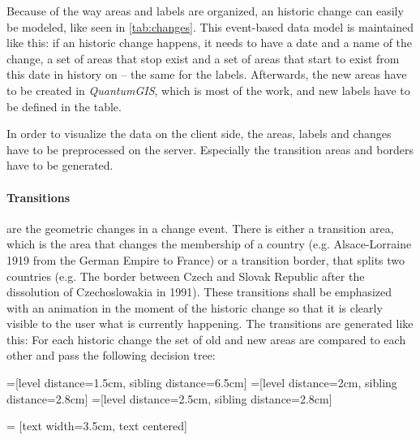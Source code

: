 Because of the way areas and labels are organized, an historic change can easily be modeled, like seen in \ref{tab:changes}. This event-based data model is maintained like this: if an historic change happens, it needs to have a date and a name of the change, a set of areas that stop exist and a set of areas that start to exist from this date in history on -- the same for the labels. Afterwards, the new areas have to be created in \textit{QuantumGIS}, which is most of the work, and new labels have to be defined in the table.

In order to visualize the data on the client side, the areas, labels and changes have to be preprocessed on the server. Especially the transition areas and borders have to be generated.

\paragraph{Transitions} are the geometric changes in a change event. There is either a transition area, which is the area that changes the membership of a country (e.g. Alsace-Lorraine 1919 from the German Empire to France) or a transition border, that splits two countries (e.g. The border between Czech and Slovak Republic after the dissolution of Czechoslowakia in 1991). These transitions shall be emphasized with an animation in the moment of the historic change so that it is clearly visible to the user what is currently happening. The transitions are generated like this: For each historic change the set of old and new areas are compared to each other and pass the following decision tree:

=[level distance=1.5cm, sibling distance=6.5cm]
=[level distance=2cm, sibling distance=2.8cm]
=[level distance=2.5cm, sibling distance=2.8cm]

 = [text width=3.5cm, text centered]

